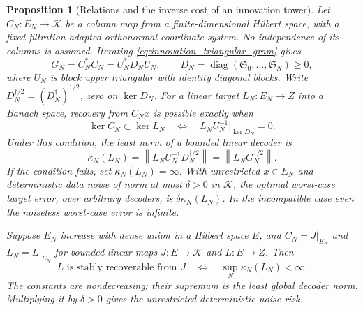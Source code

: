 \documentclass[11pt,a4paper]{amsart}
\numberwithin{equation}{section}
\newtheorem{proposition}[theorem]{Proposition}
\theoremstyle{definition}
\theoremstyle{remark}
\DeclareMathOperator{\diag}{diag}
\newcommand{\norm}[1]{\left\lVert#1\right\rVert}
\begin{document}
\begin{proposition}[Relations and the inverse cost of an innovation tower]\label{prop:innovation_decoder}
Let $C_N:E_N\to\mathcal K$ be a column map from a finite-dimensional Hilbert space, with a fixed filtration-adapted orthonormal coordinate system. No independence of its columns is assumed. Iterating \eqref{eq:innovation_triangular_gram} gives
\[
 G_N=C_N^*C_N=U_N^*D_NU_N,\qquad
 D_N=\diag(\mathfrak S_0,\ldots,\mathfrak S_N)\ge0,
\]
where $U_N$ is block upper triangular with identity diagonal blocks. Write $D_N^{\dagger/2}=(D_N^\dagger)^{1/2}$, zero on $\ker D_N$. For a linear target $L_N:E_N\to Z$ into a Banach space, recovery from $C_Nx$ is possible exactly when
\begin{equation}\label{eq:innovation_relation_test}
 \ker C_N\subset\ker L_N
 \quad\Longleftrightarrow\quad
 L_NU_N^{-1}|_{\ker D_N}=0.
\end{equation}
Under this condition, the least norm of a bounded linear decoder is
\begin{equation}\label{eq:innovation_exact_cost}
 \kappa_N(L_N)=\norm{L_NU_N^{-1}D_N^{\dagger/2}}
              =\norm{L_NG_N^{\dagger/2}}.
\end{equation}
If the condition fails, set $\kappa_N(L_N)=\infty$. With unrestricted $x\in E_N$ and deterministic data noise of norm at most $\delta>0$ in $\mathcal K$, the optimal worst-case target error, over arbitrary decoders, is $\delta\kappa_N(L_N)$. In the incompatible case even the noiseless worst-case error is infinite.

Suppose $E_N$ increase with dense union in a Hilbert space $E$, and $C_N=J|_{E_N}$ and $L_N=L|_{E_N}$ for bounded linear maps $J:E\to\mathcal K$ and $L:E\to Z$. Then
\begin{equation}\label{eq:innovation_tower_criterion}
 L\text{ is stably recoverable from }J
 \quad\Longleftrightarrow\quad
 \sup_N\kappa_N(L_N)<\infty.
\end{equation}
The constants are nondecreasing; their supremum is the least global decoder norm. Multiplying it by $\delta>0$ gives the unrestricted deterministic noise risk.
\end{proposition}
\end{document}
